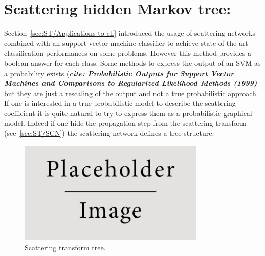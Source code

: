 \documentclass[a4paper,11pt]{report}
\begin{document}
{		
\chapter{Scattering hidden Markov tree:}
  \label{chap:SHMT}
  Section~\ref{sec:ST/Applications to clf} introduced the usage of scattering networks combined with an support vector machine classifier to achieve state of the art classification performances on some problems. However this method provides a boolean answer for each class. Some methods to express the output of an SVM as a probability exists (\textbf{\textit{cite: Probabilistic Outputs for Support Vector Machines and Comparisons to Regularized Likelihood Methods (1999)}} but they are just a rescaling of the output and not a true probabilistic approach. If one is interested in a true probabilistic model to describe the scattering coefficient it is quite natural to try to express them as a probabilistic graphical model. Indeed if one hide the propagation step from the scattering transform (see~\ref{sec:ST/SCN}) the scattering network defines a tree structure. \\

	\begin{figure}
			\begin{center}
				\includegraphics[width=3.5in]{placeholder.jpg}
				\caption{Scattering transform tree.} %
				\label{fig:ST tree}
			\end{center}
	\end{figure}
  
}
\end{document}
